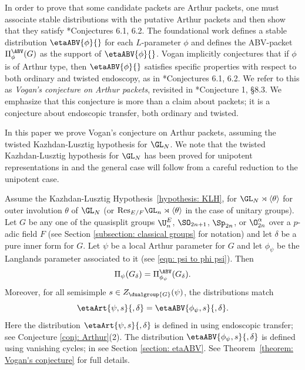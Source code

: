 \documentclass[11pt,letterpaper]{amsart}
\numberwithin{equation}{section}
\begin{document}
In order to prove that some candidate packets are Arthur packets, one must associate stable distributions with the putative Arthur packets and then show that they satisfy \cite{Art89}*{Conjectures 6.1, 6.2}. 
The foundational work \cite{Vog93} defines a stable distribution $\etaABV{\phi}{}$ for each $L$-parameter $\phi$ and defines the ABV-packet $\Pi^\ABV_\phi(G)$ as the support of $\etaABV{\phi}{}$. Vogan
implicitly conjectures that if $\phi$ is of Arthur type, then $\etaABV{\phi}{}$ satisfies specific properties with respect to both ordinary and twisted endoscopy, as in \cite{Art89}*{Conjectures 6.1, 6.2}. 
We refer to this as {\it Vogan's conjecture on Arthur packets}, revisited in \cite{CFMMX22}*{Conjecture 1, \S 8.3}. We emphasize that this conjecture is more than a claim about packets; it is a conjecture about endoscopic transfer, both ordinary and twisted.


In this paper we prove Vogan's conjecture on Arthur packets, assuming the twisted Kazhdan-Lusztig hypothesis for $\GL_N$. 
We note that the twisted Kazhdan-Lusztig hypothesis for $\GL_N$ has been proved for unipotent representations in \cite{CHAI} and the general case will follow from a careful reduction to the unipotent case. 

\begin{theorem} 
\label{theorem intro: Vogan's conjecture}  
Assume the Kazhdan-Lusztig Hypothesis~\ref{hypothesis: KLH}, for $\GL_N\rtimes{\langle\theta\rangle}$ for outer involution $\theta$ of $\GL_N$ (or $\mathrm{Res}_{E/F}\GL_n\rtimes\langle\theta\rangle$ in the case of unitary groups).
    Let $G$ be any one of the quasisplit groups $\U^E_n$, $\SO_{2n+1}$, $\Sp_{2n}$, or $\O^\alpha_{2n}$ over a $p$-adic field $F$ (see Section \ref{subsection: classical groups} for notation) and let $\delta$ be a pure inner form for $G$.
Let $\psi$ be a local Arthur parameter for $G$ and let $\phi_\psi$ be the Langlands parameter associated to it (see \eqref{eqn: psi to phi psi}).
Then
\[
\Pi_\psi(G_\delta) = \Pi^\ABV_{\phi_\psi}(G_\delta).
\]
Moreover, for all semisimple $s\in Z_{\dualgroup{G}}(\psi)$, the distributions match
\[ \etaArt{\psi,s}{,\delta}= \etaABV{\phi_{\psi},s}{,\delta}.\]
Here the distribution $\etaArt{\psi,s}{,\delta}$ is defined in \cite{Art13} using endoscopic transfer; see Conjecture \ref{conj: Arthur}(2). The distribution $ \etaABV{\phi_{\psi},s}{,\delta}$ is defined using vanishing cycles; in see Section \ref{section: etaABV}. 
See Theorem~\ref{theorem: Vogan's conjecture} for full details. 
\end{theorem}
\end{document}

